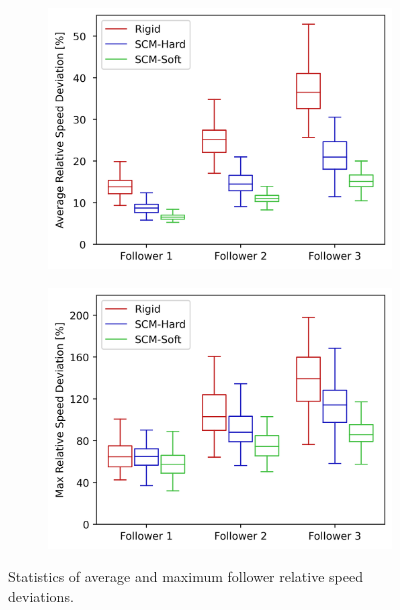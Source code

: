 \documentclass[12pt,twocolumn]{article}
\begin{document}
\begin{figure}
    \centering
    \begin{subfigure}{0.45\textwidth}
        \includegraphics[width=\columnwidth]{Figs/StatisticalAnalysis/metric_rel_speed_avg.png}
        \caption{} \label{fig:metricrelspeedavg}
    \end{subfigure}
    \begin{subfigure}{0.45\textwidth}
        \includegraphics[width=\columnwidth]{Figs/StatisticalAnalysis/metric_rel_speed_max.png}
        \caption{} \label{fig:metricrelspeedmax}
    \end{subfigure}%
    \caption{Statistics of average and maximum follower relative speed deviations.}  
    \label{fig:metricrelspeed}
\end{figure}
\end{document}
